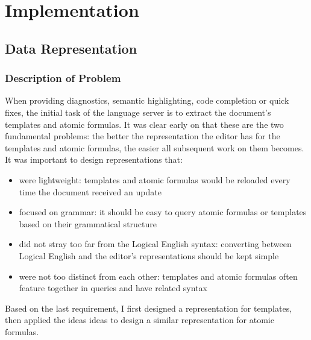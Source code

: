 \documentclass[../main.tex]{subfiles}
\begin{document}
\chapter{Implementation}
\label{chapter:impl}
\section{Data Representation}
\subsection{Description of Problem}
When providing diagnostics, semantic highlighting, code completion or quick fixes, the initial task of the language server is to extract the document's templates and atomic formulas. It was clear early on that these are the two fundamental problems: the better the representation the editor has for the templates and atomic formulas, the easier all subsequent work on them becomes. It was important to design representations that:
\begin{itemize}
    \item were lightweight: templates and atomic formulas would be reloaded every time the document received an update
    \item focused on grammar: it should be easy to query atomic formulas or templates based on their grammatical structure
    \item did not stray too far from the Logical English syntax: converting between Logical English and the editor's representations should be kept simple
    \item were not too distinct from each other: templates and atomic formulas often feature together in queries and have related syntax
\end{itemize}
Based on the last requirement, I first designed a representation for templates, then applied the ideas ideas to design a similar representation for atomic formulas. 
\end{document}
